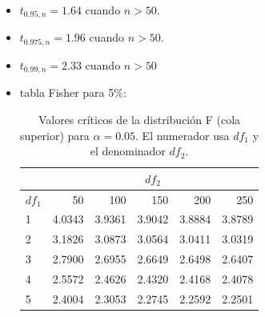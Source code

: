 \documentclass[10pt,a4paper]{article}
\begin{document}
\begin{itemize}
\item $t_{0.95,n} = 1.64$ cuando $n >50$.
\item $t_{0.975,n} = 1.96$ cuando $n >50$.
\item $t_{0.99,n}=2.33$ cuando $n>50$


\item tabla Fisher para 5\%:
\begin{table}[H]
\centering
\caption{Valores críticos de la distribución F (cola superior) para $\alpha=0.05$. 
El numerador usa $df_1$ y el denominador $df_2$.}
\label{tab:Fcrit_5pct}
\begin{tabular}{|l|r|r|r|r|r|}
\toprule
\hline
& \multicolumn{5}{c|}{$df_2$} \\
\hline
$df_1$ & 50 & 100 & 150 & 200 & 250 \\
\hline
\midrule
1 & 4.0343 & 3.9361 & 3.9042 & 3.8884 & 3.8789 \\
\hline
2 & 3.1826 & 3.0873 & 3.0564 & 3.0411 & 3.0319 \\
\hline
3 & 2.7900 & 2.6955 & 2.6649 & 2.6498 & 2.6407 \\
\hline
4 & 2.5572 & 2.4626 & 2.4320 & 2.4168 & 2.4078 \\
\hline
5 & 2.4004 & 2.3053 & 2.2745 & 2.2592 & 2.2501 \\
\hline
\bottomrule
\end{tabular}
\end{table}

\end{itemize}
\end{document}
